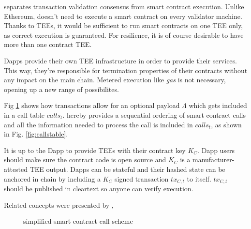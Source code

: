 \documentclass[conference]{IEEEtran}
\begin{document}

\encointer separates transaction validation consensus from smart contract execution. Unlike Ethereum, \encointer doesn't need to execute a smart contract on every validator machine. Thanks to TEEs, it would be sufficient to run smart contracts on one TEE only, as correct execution is guaranteed. For resilience, it is of course desirable to have more than one contract TEE.

\encointer Dapps provide their own TEE infrastructure in order to provide their services. This way, they're responsible for termination properties of their contracts without any impact on the \encointer main chain. Metered execution like \textit{gas} is not necessary, opening up a new range of possibilites. 

Fig \ref{fig:calls} shows how \encointer transactions allow for an optional payload $\Lambda$ which gets included in a call table $calls_t$. \encointer hereby provides a sequential ordering of smart contract calls and all the information needed to process the call is included in $calls_t$, as shown in Fig. \ref{fig:callstable}.

It is up to the Dapp to provide TEEs with their contract key $K_C$. Dapp users should make sure the contract code is open source and $K_C$ is a manufacturer-attested TEE output.
Dapps can be stateful and their hashed state can be anchored in \encointer chain by including a $K_C$ signed transaction $tx_{C,t}$ to itself. $tx_{C,t}$ should be published in cleartext so anyone can verify execution.

Related concepts were presented by \cite{ekiden}, \cite{sawtoothpdo}


\begin{figure}
	\centering
	\def\svgwidth{\columnwidth}
	
	\caption{simplified smart contract call scheme}
	\label{fig:calls}
\end{figure}
\end{document}
